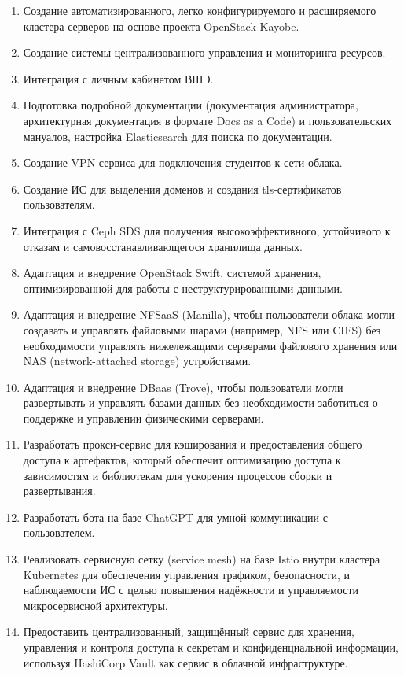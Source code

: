 \documentclass[14pt, a4paper]{extarticle}
\begin{document}
\begin{enumerate}
\item Создание автоматизированного, легко конфигурируемого и расширяемого кластера серверов на основе проекта OpenStack Kayobe.
\item Создание системы централизованного управления и мониторинга ресурсов.
\item Интеграция с личным кабинетом ВШЭ.
\item Подготовка подробной документации (документация администратора, архитектурная документация в формате Docs as a Code) и пользовательских мануалов, настройка Elasticsearch для поиска по документации.
\item Создание VPN сервиса для подключения студентов к сети облака.
\item Создание ИС для выделения доменов и создания tls-сертификатов пользователям.
\item Интеграция с Ceph SDS для получения высокоэффективного, устойчивого к отказам и самовосстанавливающегося хранилища данных.
\item Адаптация и внедрение OpenStack Swift, системой хранения, оптимизированной для работы с неструктурированными данными.
\item Адаптация и внедрение NFSaaS (Manilla), чтобы пользователи облака могли создавать и управлять файловыми шарами (например, NFS или CIFS) без необходимости управлять нижележащими серверами файлового хранения или NAS (network-attached storage) устройствами.
\item Адаптация и внедрение DBaas (Trove), чтобы пользователи могли развертывать и управлять базами данных без необходимости заботиться о поддержке и управлении физическими серверами.
\item Разработать прокси-сервис для кэширования и предоставления общего доступа к артефактов, который обеспечит оптимизацию доступа к зависимостям и библиотекам для ускорения процессов сборки и развертывания.
\item Разработать бота на базе ChatGPT для умной коммуникации с пользователем.
\item Реализовать сервисную сетку (service mesh) на базе Istio внутри кластера Kubernetes для обеспечения управления трафиком, безопасности, и наблюдаемости ИС с целью повышения надёжности и управляемости микросервисной архитектуры.
\item Предоставить централизованный, защищённый сервис для хранения, управления и контроля доступа к секретам и конфиденциальной информации, используя HashiCorp Vault как сервис в облачной инфраструктуре.

\end{enumerate}
\end{document}
